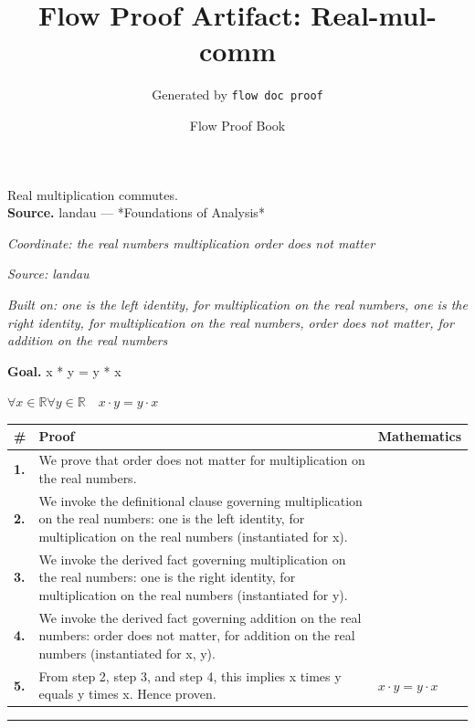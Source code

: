 \documentclass[11pt]{article}
\title{Flow Proof Artifact: Real-mul-comm}
\author{Generated by \texttt{flow doc proof}}
\date{Flow Proof Book}
\theoremstyle{definition}
\begin{document}
\maketitle
Real multiplication commutes.\\[0.5em]
\textbf{Source.} landau — *Foundations of Analysis*\\[0.5em]
\bigskip
{}\par
\smallskip\noindent\textit{Coordinate: the real numbers \cdot multiplication \cdot order does not matter}\par
\smallskip\noindent\textit{Source: landau}\par
\smallskip\noindent\textit{Built on: one is the left identity, for multiplication on the real numbers, one is the right identity, for multiplication on the real numbers, order does not matter, for addition on the real numbers}\par
\medskip
\noindent\textbf{Goal.} x * y = y * x\par
\noindent$\displaystyle \forall x \in \mathbb{R} \forall y \in \mathbb{R}\quad x \cdot y = y \cdot x$\par
\medskip
\noindent
\begin{tabular}{@{} >{\raggedright\arraybackslash}p{} >{\raggedright\arraybackslash}p{} >{\raggedleft\arraybackslash}p{} @{}}
\textbf{\#} & \textbf{Proof} & \textbf{Mathematics} \\
\midrule
\textbf{1.} & We prove that order does not matter for multiplication on the real numbers. & \\[0.45em]
\textbf{2.} & We invoke the definitional clause governing multiplication on the real numbers: one is the left identity, for multiplication on the real numbers (instantiated for x). & \\[0.45em]
\textbf{3.} & We invoke the derived fact governing multiplication on the real numbers: one is the right identity, for multiplication on the real numbers (instantiated for y). & \\[0.45em]
\textbf{4.} & We invoke the derived fact governing addition on the real numbers: order does not matter, for addition on the real numbers (instantiated for x, y). & \\[0.45em]
\textbf{5.} & From step 2, step 3, and step 4, this implies x times y equals y times x. Hence proven. & $\displaystyle x \cdot y = y \cdot x$ \\[0.45em]
\bottomrule
\end{tabular}
\label{thm:Real-multiplication-order_does_not_matter}
\par\medskip\hrule
\end{document}
